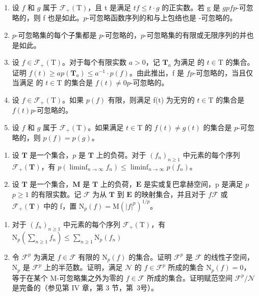 \begin{enumerate}
\def\labelenumi{\alph{enumi})}
\item
  设 \(f\) 和 \(g\) 属于 \(\mathcal{F}_{+}(\mathrm{T})\)，且 t 是满足 \(t\)\(f \leqslant t \cdot g\) 的正实数。若 g 是 \(g\)\(p\)\(f\)\(p\)-可忽略的，则 f 也是如此。\(p\)-可忽略函数序列的和与上包络也是 -可忽略的。
\item
  \(p\)-可忽略集的每个子集都是 \(p\)-可忽略的，\(p\)-可忽略集的有限或无限序列的并也是如此。
\item
  设 \(f \in \mathcal{F}_+(\mathrm{T})\)。对于每个有限实数 \(a > 0\)，记 \(\mathbf{T}_a\) 为满足  的 \(t \in \mathrm{T}\) 的集合。证明 \(f(t) \geqslant a\)\(p(\mathbf{T}_a) \leqslant a^{-1} \cdot p(f)\)。由此推出，f 是 \(f\)\(p\)-可忽略的，当且仅当满足  的 \(t \in \mathrm{T}\) 的集合是 \(f(t) \neq 0\)\(p\)-可忽略的。
\item
  设 \(f \in \mathcal{F}_{+}(\mathrm{T})\)。如果 \(p(f)\) 有限，则满足 f(t) 为无穷的 \(t \in \mathrm{T}\) 的集合是 \(f(t)\)\(p\)-可忽略的。
\item
  设 \(f\) 和 \(g\) 属于 \(\mathcal{F}_{+}(\mathrm{T})\)。如果满足 \(t \in \mathrm{T}\) 的 \(f(t) \neq g(t)\) 的集合是 \(p\)-可忽略的，则 \(p(f) = p(g)\)。
\end{enumerate}

\begin{enumerate}
\def\labelenumi{\arabic{enumi})}
\setcounter{enumi}{2}
\item
  设 \(\mathbf{T}\) 是一个集合，\(p\) 是 \(\mathbf{T}\) 上的负荷。对于 \((f_n)_{n\geqslant 1}\) 中元素的每个序列 \(\mathcal{F}_{+}(\mathbf{T})\)，有 \(p(\liminf_{n\to \infty}f_n)\leqslant \liminf_{n\to \infty}p(f_n)\)。
\item
  设 \(\mathbf{T}\) 是一个集合，\(\mathbf{M}\) 是 \(\mathbf{T}\) 上的负荷，\(\mathbf{E}\) 是实或复巴拿赫空间，p 是满足 \(p\)\(p \geqslant 1\) 的有限实数。记 \(\mathcal{F}\) 为从 \(\mathbf{T}\) 到 \(\mathbf{E}\) 的映射集合，并且对于 \(f\)\(\mathcal{F}\) 或 \(\mathcal{F}_{+}(\mathbf{T})\) 中的 f，置 \(\mathrm{N}_p(f) = \mathrm{M}(|f|^p)^{1/p}\)。
\end{enumerate}

\begin{enumerate}
\def\labelenumi{\alph{enumi})}
\item
  对于 \((f_n)_{n\geqslant 1}\) 中元素的每个序列 \(\mathcal{F}_{+}(\mathrm{T})\)，有 \(\mathrm{N}_p\left(\sum_{n\geqslant 1}f_n\right)\leqslant \sum_{n\geqslant 1}\mathrm{N}_p(f_n)\)
\item
  令 \(\mathcal{F}^p\) 为满足 \(f \in \mathcal{F}\) 有限的 \(\mathrm{N}_p(f)\) 的集合。证明 \(\mathcal{F}^p\) 是 \(\mathcal{F}\) 的线性子空间，\(\mathrm{N}_p\) 是 \(\mathcal{F}^p\) 上的半范数。证明，满足 \(\mathcal{N}\) 的 \(f \in \mathcal{F}^p\) 所成的集合 \(\mathrm{N}_p(f) = 0\)，等于在某个 M-可忽略集之外为零的 \(f \in \mathcal{F}\) 所成的集合。证明赋范空间 \(\mathcal{F}^p / \mathcal{N}\) 是完备的（参见第 IV 章，第 3 节，第~3号）。
\end{enumerate}

